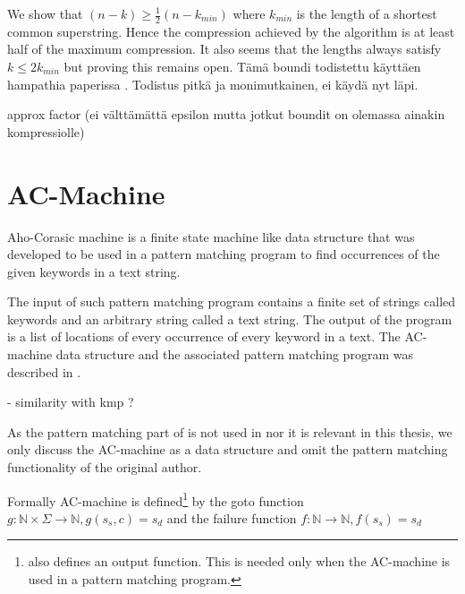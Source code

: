 \documentclass[english,twoside,censored,csm,algorithms-track-2020]{HYthesisML}
\theoremstyle{plain}
\theoremstyle{definition}
\begin{document}
\begin{lemma}[]



We show that $(n-k)\geq \frac{1}{2}(n-k_{min})$ where  $k_{min}$ is the length of a shortest common superstring. Hence the compression achieved by the algorithm is at least half of the maximum compression. It also seems that the lengths always satisfy $k\leq 2k_{min}$ but proving this remains open.
Tämä boundi todistettu käyttäen hampathia paperissa \citep{Tarhio88}.
Todistus pitkä ja monimutkainen, ei käydä nyt läpi. 

  approx factor (ei välttämättä epsilon mutta jotkut boundit on olemassa ainakin kompressiolle)



\section{AC-Machine}


  
  Aho-Corasic machine is a finite state machine like data structure that was developed to be used
  in a pattern matching program to find occurrences of the given keywords in a text string. \citep{aho75}

  The input of such pattern matching program contains a finite set of strings called keywords and an
  arbitrary string called a text string. The output of the program is a list of locations of every
  occurrence of every keyword in a text. The AC-machine data structure and the associated pattern
  matching program was described in \citep{aho75}.

  - similarity with kmp ?

  As the pattern matching part of \citep{aho75} is not used in \citep{ukkonen90} nor it is relevant in
  this thesis, we only discuss the AC-machine as a data structure and omit the pattern matching
  functionality of the original author.


  Formally AC-machine is defined\footnote{\citep{aho75} also defines an output function.
  This is needed only when the AC-machine is used in a pattern matching program.} by the goto function
  $g : \mathbb{N} \times \Sigma \rightarrow \mathbb{N}, g(s_s,c) = s_d$ and the failure function
  $f : \mathbb{N} \rightarrow \mathbb{N}, f(s_s) = s_d$


\end{lemma}
\end{document}
